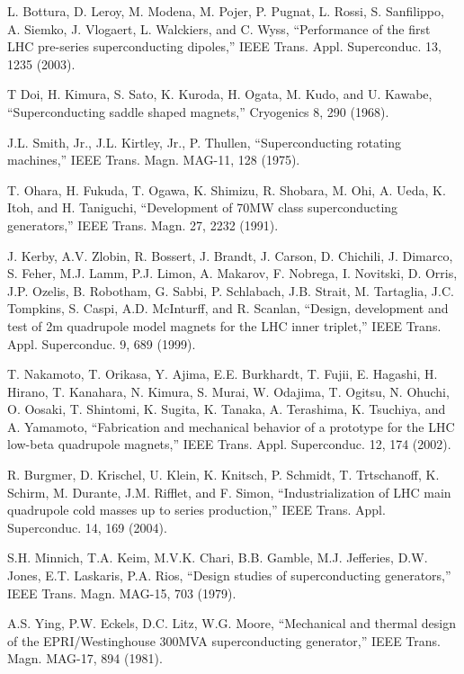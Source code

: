 \noindent [3.40] L. Bottura, D. Leroy, M. Modena, M. Pojer, P. Pugnat, L. Rossi, S. Sanfilippo,
A. Siemko, J. Vlogaert, L. Walckiers, and C. Wyss, ``Performance of the first LHC
pre-series superconducting dipoles,” IEEE Trans. Appl. Superconduc. 13, 1235
(2003).

\noindent [3.41] T Doi, H. Kimura, S. Sato, K. Kuroda, H. Ogata, M. Kudo, and U. Kawabe,
``Superconducting saddle shaped magnets,” Cryogenics 8, 290 (1968).

\noindent [3.42] J.L. Smith, Jr., J.L. Kirtley, Jr., P. Thullen, ``Superconducting rotating machines,”
IEEE Trans. Magn. MAG-11, 128 (1975).

\noindent [3.43] T. Ohara, H. Fukuda, T. Ogawa, K. Shimizu, R. Shobara, M. Ohi, A. Ueda,
K. Itoh, and H. Taniguchi, ``Development of 70MW class superconducting generators,”
IEEE Trans. Magn. 27, 2232 (1991).

\noindent [3.44] J. Kerby, A.V. Zlobin, R. Bossert, J. Brandt, J. Carson, D. Chichili, J. Dimarco,
S. Feher, M.J. Lamm, P.J. Limon, A. Makarov, F. Nobrega, I. Novitski, D. Orris,
J.P. Ozelis, B. Robotham, G. Sabbi, P. Schlabach, J.B. Strait, M. Tartaglia,
J.C. Tompkins, S. Caspi, A.D. McInturff, and R. Scanlan, ``Design, development
and test of 2m quadrupole model magnets for the LHC inner triplet,” IEEE Trans.
Appl. Superconduc. 9, 689 (1999).

\noindent [3.45] T. Nakamoto, T. Orikasa, Y. Ajima, E.E. Burkhardt, T. Fujii, E. Hagashi, H. Hirano, T. Kanahara, N. Kimura, S. Murai, W. Odajima, T. Ogitsu, N. Ohuchi,
O. Oosaki, T. Shintomi, K. Sugita, K. Tanaka, A. Terashima, K. Tsuchiya, and
A. Yamamoto, ``Fabrication and mechanical behavior of a prototype for the LHC
low-beta quadrupole magnets,” IEEE Trans. Appl. Superconduc. 12, 174 (2002).

\noindent [3.46] R. Burgmer, D. Krischel, U. Klein, K. Knitsch, P. Schmidt, T. Trtschanoff, K.
Schirm, M. Durante, J.M. Rifflet, and F. Simon, ``Industrialization of LHC main
quadrupole cold masses up to series production,” IEEE Trans. Appl. Superconduc.
14, 169 (2004).

\noindent [3.47] S.H. Minnich, T.A. Keim, M.V.K. Chari, B.B. Gamble, M.J. Jefferies, D.W. Jones, E.T. Laskaris, P.A. Rios, ``Design studies of superconducting generators,” IEEE Trans. Magn. MAG-15, 703 (1979).

\noindent [3.48] A.S. Ying, P.W. Eckels, D.C. Litz, W.G. Moore, ``Mechanical and thermal design
of the EPRI/Westinghouse 300MVA superconducting generator,” IEEE Trans.
Magn. MAG-17, 894 (1981).

